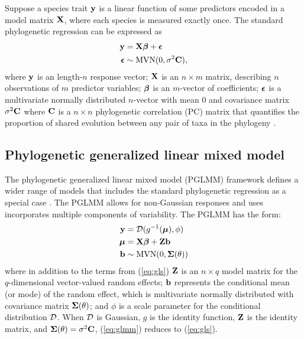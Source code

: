 \documentclass[12pt]{article}
\begin{document}
Suppose a species trait ${\mathbf y}$ is a linear function of some predictors encoded in a model matrix ${\mathbf X}$, where each species is measured exactly once. 
The standard phylogenetic regression can be expressed as
\begin{equation}
\begin{aligned}
{\mathbf y} & = {\mathbf X} {\boldsymbol \beta} + {\boldsymbol \epsilon}  \\
{\boldsymbol \epsilon} & \sim \textrm{MVN}(0,\sigma^{2} {\mathbf C}), 
\label{eq:gls}
\end{aligned}
\end{equation}
where ${\mathbf y}$ is an length-$n$ response vector; ${\mathbf X}$ is an $n \times m$ matrix, describing $n$ observations of $m$ predictor variables; ${\boldsymbol \beta}$ is an $m$-vector of coefficients; ${\boldsymbol \epsilon}$ is a multivariate normally distributed $n$-vector with mean $0$ and covariance matrix $\sigma^{2} {\mathbf C}$ where ${\mathbf C}$ is a $n \times n$ phylogenetic correlation (PC) matrix that quantifies the proportion of shared evolution between any pair of taxa in the phylogeny \citep{garamszegi2014modern}.

\subsection*{Phylogenetic generalized linear mixed model}

The phylogenetic generalized linear mixed model (PGLMM) framework defines a wider range of models that includes the standard phylogenetic regression as a special case \citep{lynch1991methods}.
The PGLMM allows for non-Gaussian responses and uses incorporates multiple components of variability.
The PGLMM has the form:
\newcommand{\dist}{{\cal D}}
\begin{equation}
\begin{aligned}
\bY & = \dist(g^{-1}(\bmu), \phi) \\
\bmu & = \bX \bbeta + \bZ \bb  \\
\bb & \sim \textrm{MVN}(0, \bSigma(\theta))  \\
\label{eq:glmm}
\end{aligned}
\end{equation}
where in addition to the terms from (\ref{eq:gls}) ${\mathbf Z}$ is an $n \times q$ model matrix for the $q$-dimensional vector-valued random effects; ${\mathbf b}$ represents the conditional mean (or mode) of the random effect, which is multivariate normally distributed with covariance matrix ${\boldsymbol \Sigma}(\theta)$; and $\phi$ is a scale parameter for the conditional distribution $\dist$.
When $\dist$ is Gaussian, $g$ is the identity function, ${\mathbf Z}$ is the identity matrix, and ${\boldsymbol \Sigma}(\theta)=\sigma^2{\mathbf C}$, (\ref{eq:glmm}) reduces to (\ref{eq:gls}).
\end{document}
